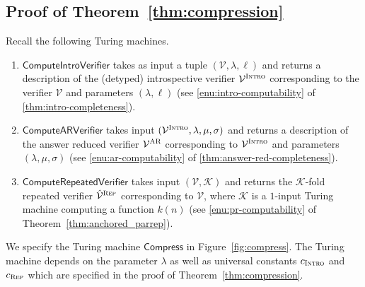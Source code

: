 \documentclass[11pt]{article}
\theoremstyle{definition}
\newcommand{\mK}{\ensuremath{\mathcal{K}}}
\newcommand{\verifier}{\mathcal{V}}
\newcommand{\gamestyle}[1]{\ensuremath{\textsc{#1}}\xspace}
\newcommand{\ar}{\gamestyle{AR}}
\newcommand{\intro}{\gamestyle{Intro}}
\renewcommand{\cal}[1]{\mathcal{#1}}
\newcommand{\tmstyle}[1]{\ensuremath{\mathsf{#1}}}
\newcommand{\Compress}{\tmstyle{Compress}}
\newcommand{\ComputeIntroVerifier}{\tmstyle{ComputeIntroVerifier}}
\newcommand{\ComputeAnsVerifier}{\tmstyle{ComputeARVerifier}}
\newcommand{\ComputeParrepVerifier}{\tmstyle{ComputeRepeatedVerifier}}
\newcommand{\rep}{\gamestyle{Rep}}
\begin{document}
\subsection{Proof of Theorem~\ref{thm:compression}}

Recall the following Turing machines. 
\begin{enumerate}
\item $\ComputeIntroVerifier$ takes as input a tuple $(\verifier, \lambda,
  \ell)$ and returns a description of the (detyped) introspective verifier
  $\verifier^\intro$ corresponding to the verifier $\verifier$ and parameters
  $(\lambda, \ell)$ (see \cref{enu:intro-computability} of
  \cref{thm:intro-completeness}).

\item $\ComputeAnsVerifier$ takes input $(\verifier^\intro, \lambda, \mu,
  \sigma)$ and returns a description of the answer reduced verifier
  $\verifier^\ar$ corresponding to $\verifier^\intro$ and parameters
  $(\lambda, \mu, \sigma)$ (see \cref{enu:ar-computability} of
  \cref{thm:answer-red-completeness}).

\item $\ComputeParrepVerifier$ takes input $(\verifier, \cal{K})$ and returns the
  $\cal{K}$-fold repeated verifier $\hat{\verifier}^\rep$ corresponding to
  $\verifier$, where $\mK$ is a $1$-input Turing machine computing a function
  $k(n)$ (see \cref{enu:pr-computability} of Theorem~\ref{thm:anchored_parrep}).
\end{enumerate}

We specify the Turing machine $\Compress$ in Figure~\ref{fig:compress}.
The Turing machine depends on the parameter $\lambda$ as well as universal
constants $c_\intro$ and $c_\rep$ which are specified in the proof of
Theorem~\ref{thm:compression}.
\end{document}
